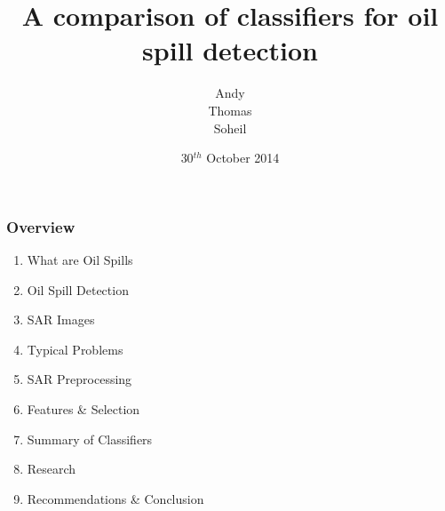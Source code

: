 \documentclass{beamer}
\title[Comparison of classifiers]{A comparison of classifiers for oil spill detection} %
\institute[TUDelft] %
{
Delft University of Technology \\ %
\medskip
}
\date{30$^{th}$ October 2014}
\author{Andy\\ Thomas\\ Soheil} %
\begin{document}
\begin{frame}
\titlepage %
\end{frame}

\begin{frame}
\frametitle{Overview} %
\begin{enumerate}
	\item What are Oil Spills
	\item Oil Spill Detection
	\item SAR Images	
	\item Typical Problems
	\item SAR Preprocessing
	\item Features \& Selection
	\item Summary of Classifiers 
	\item Research
	\item Recommendations \& Conclusion
\end{enumerate}

\end{frame}



\end{document}
